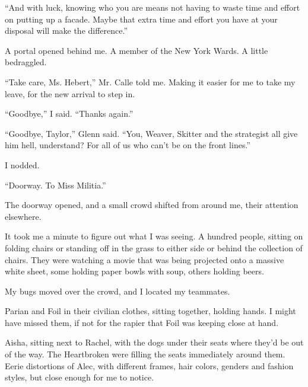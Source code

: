``And with luck, knowing who you are means not having to waste time and effort on putting up a facade.  Maybe that extra time and effort you have at your disposal will make the difference.''



A portal opened behind me.  A member of the New York Wards.  A little bedraggled.



``Take care, Ms. Hebert,'' Mr. Calle told me.  Making it easier for me to take my leave, for the new arrival to step in.



``Goodbye,'' I said.  ``Thanks again.''



``Goodbye, Taylor,'' Glenn said.  ``You, Weaver, Skitter and the strategist all give him hell, understand?  For all of us who can't be on the front lines.''



I nodded.



``Doorway.  To Miss Militia.''



\blacksquare



The doorway opened, and a small crowd shifted from around me, their attention elsewhere.



It took me a minute to figure out what I was seeing.  A hundred people, sitting on folding chairs or standing off in the grass to either side or behind the collection of chairs.  They were watching a movie that was being projected onto a massive white sheet, some holding paper bowls with soup, others holding beers.



My bugs moved over the crowd, and I located my teammates.



Parian and Foil in their civilian clothes, sitting together, holding hands.  I might have missed them, if not for the rapier that Foil was keeping close at hand.



Aisha, sitting next to Rachel, with the dogs under their seats where they'd be out of the way.  The Heartbroken were filling the seats immediately around them.  Eerie distortions of Alec, with different frames, hair colors, genders and fashion styles, but close enough for me to notice.



